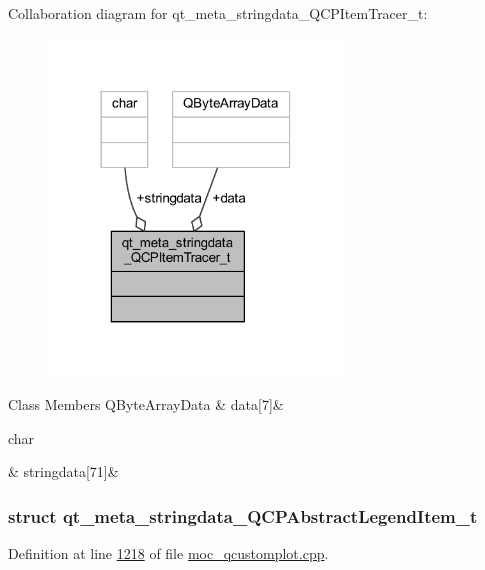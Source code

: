 Collaboration diagram for qt\+\_\+meta\+\_\+stringdata\+\_\+\+Q\+C\+P\+Item\+Tracer\+\_\+t\+:
\nopagebreak
\begin{figure}[H]
\begin{center}
\leavevmode
\includegraphics[width=222pt]{d8/d64/a00181}
\end{center}
\end{figure}
\begin{DoxyFields}{Class Members}
\hypertarget{a00016_a87c91fdce2044ef334c2cfd91e38ac00}{Q\+Byte\+Array\+Data}\label{a00016_a87c91fdce2044ef334c2cfd91e38ac00}
&
data\mbox{[}7\mbox{]}&
\\
\hline

\hypertarget{a00016_a28c4c1cde887cbe6b6af18ce9d6ed867}{char}\label{a00016_a28c4c1cde887cbe6b6af18ce9d6ed867}
&
stringdata\mbox{[}71\mbox{]}&
\\
\hline

\end{DoxyFields}
\label{d1/d44/a00098}
\hypertarget{a00016_d1/d44/a00098}{}
\subsubsection{struct qt\+\_\+meta\+\_\+stringdata\+\_\+\+Q\+C\+P\+Abstract\+Legend\+Item\+\_\+t}


Definition at line \hyperlink{a00016_source_l01218}{1218} of file \hyperlink{a00016_source}{moc\+\_\+qcustomplot.\+cpp}.




